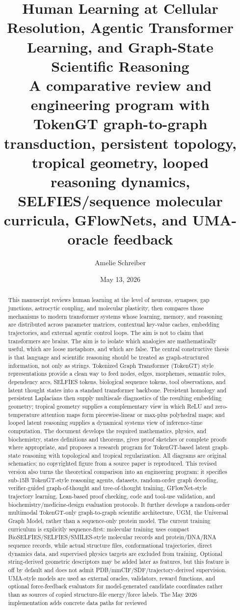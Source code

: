 \documentclass[11pt]{article}
\title{\vspace{-0.5in}\textbf{Human Learning at Cellular Resolution, Agentic Transformer Learning, and Graph-State Scientific Reasoning}\\[0.3em]
\large A comparative review and engineering program with TokenGT graph-to-graph transduction, persistent topology, tropical geometry, looped reasoning dynamics, SELFIES/sequence molecular curricula, GFlowNets, and UMA-oracle feedback}
\author{Amelie Schreiber}
\date{May 13, 2026}
\newcommand{\1}{\mathbf{1}}
\newcommand{\UGM}{\textsc{UGM}}
\begin{document}
\maketitle

\begin{abstract}
This manuscript reviews human learning at the level of neurons, synapses, gap junctions, astrocytic coupling, and molecular plasticity, then compares those mechanisms to modern transformer systems whose learning, memory, and reasoning are distributed across parameter matrices, contextual key-value caches, embedding trajectories, and external agentic control loops. The aim is not to claim that transformers are brains. The aim is to isolate which analogies are mathematically useful, which are loose metaphors, and which are false. The central constructive thesis is that language and scientific reasoning should be treated as graph-structured information, not only as strings. Tokenized Graph Transformer (TokenGT) style representations provide a clean way to feed nodes, edges, morphemes, semantic roles, dependency arcs, SELFIES tokens, biological sequence tokens, tool observations, and latent thought states into a standard transformer backbone. Persistent homology and persistent Laplacians then supply multiscale diagnostics of the resulting embedding geometry; tropical geometry supplies a complementary view in which ReLU and zero-temperature attention maps form piecewise-linear or max-plus polyhedral maps; and looped latent reasoning supplies a dynamical systems view of inference-time computation. The document develops the required mathematics, physics, and biochemistry, states definitions and theorems, gives proof sketches or complete proofs where appropriate, and proposes a research program for TokenGT-based latent graph-state reasoning with topological and tropical regularization. All diagrams are original schematics; no copyrighted figure from a source paper is reproduced. This revised version also turns the theoretical comparison into an engineering program: it specifies sub-15B TokenGT-style reasoning agents, datasets, random-order graph decoding, verifier-guided graph-of-thought and tree-of-thought training, GFlowNet-style trajectory learning, Lean-based proof checking, code and tool-use validation, and biochemistry/medicine-design evaluation protocols. It further develops a random-order multimodal TokenGT-only graph-to-graph scientific architecture, \UGM, the Universal Graph Model, rather than a sequence-only protein model. The current training curriculum is explicitly sequence-first: molecular training uses compact BioSELFIES/SELFIES/SMILES-style molecular records and protein/DNA/RNA sequence records, while actual structure files, conformational trajectories, direct dynamics data, and supervised physics targets are excluded from training. Optional string-derived geometric descriptors may be added later as features, but this feature is off by default and does not admit PDB/mmCIF/SDF/trajectory-derived supervision. UMA-style models are used as external oracles, validators, reward functions, and optional force-feedback evaluators for model-generated candidate coordinates rather than as sources of copied structure-file energy/force labels. The May 2026 implementation adds concrete data paths for reviewed 
\end{abstract}
\end{document}
